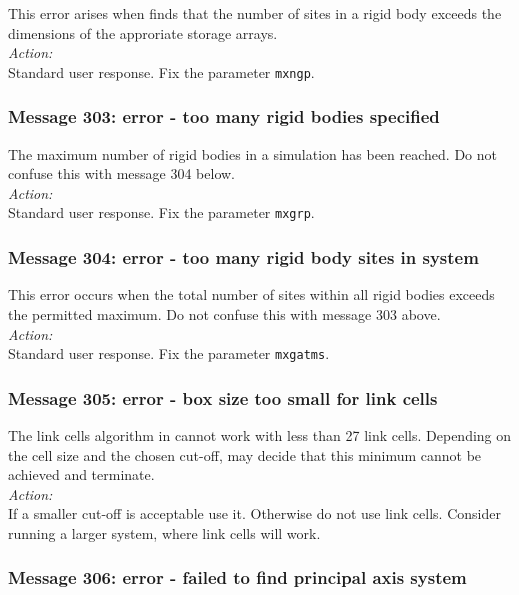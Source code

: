 This error arises when \D{} finds that the number of sites in a rigid
body  exceeds the dimensions of the approriate storage arrays.\\

\noindent
{\em Action:}\\
Standard user response. Fix the parameter {\tt mxngp}.

\subsubsection*{Message 303: error - too many rigid bodies specified}

The maximum number of rigid bodies  in a simulation has been reached.
Do not confuse this with message 304 below. \\

\noindent
{\em Action:}\\
Standard user response. Fix the parameter {\tt mxgrp}.

\subsubsection*{Message 304: error - too many rigid body sites in
system}

This error occurs when the total number of sites within all rigid
bodies  exceeds the permitted maximum. Do not confuse this with
message 303 above. \\

\noindent
{\em Action:} \\
Standard user response. Fix the parameter {\tt mxgatms}.

\subsubsection*{Message 305: error - box size too small for link cells}

The link cells algorithm in \D{} cannot work with less than 27 link
cells. Depending on the cell size and the chosen cut-off, \D{} may
decide that this minimum cannot be achieved and terminate.\\

\noindent
{\em Action:}\\
If a smaller cut-off is acceptable use it. Otherwise do not use link
cells. Consider running a larger system, where link cells will work.

\subsubsection*{Message 306: error - failed to find principal axis
system}

